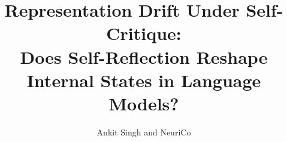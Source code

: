 \documentclass{article}
\title{Representation Drift Under Self-Critique:\\Does Self-Reflection Reshape Internal States in Language Models?}
\author{Ankit Singh and NeuriCo}
\begin{document}
\maketitle

\begin{abstract}

\end{abstract}










\end{document}
